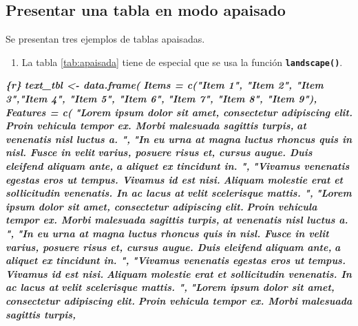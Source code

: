 \documentclass[12pt,a4paper,]{book}
\newenvironment{Shaded}{\begin{snugshade}}{\end{snugshade}}
\newcommand{\InformationTok}[1]{\textcolor[rgb]{0.56,0.35,0.01}{\textbf{\textit{#1}}}}
\providecommand{\tightlist}{%
  \setlength{\itemsep}{0pt}\setlength{\parskip}{0pt}}
\numberwithin{dummy}{section}
\theoremstyle{ocrenumbox}
\theoremstyle{blacknumex}
\theoremstyle{blacknumbox}
\theoremstyle{ocrenum}
\theoremstyle{ocrenum}
\begin{document}
\hypertarget{presentar-una-tabla-en-modo-apaisado}{%
\subsection{Presentar una tabla en modo
apaisado}\label{presentar-una-tabla-en-modo-apaisado}}

Se presentan tres ejemplos de tablas apaisadas.

\begin{enumerate}
\def\labelenumi{\arabic{enumi}.}
\tightlist
\item
  La tabla \ref{tab:apaisada} tiene de especial que se usa la función
  \textbf{\texttt{landscape()}}.
\end{enumerate}

\begin{Shaded}
\begin{Highlighting}[]
\InformationTok{\textasciigrave{}\textasciigrave{}\textasciigrave{}\{r\}}
\InformationTok{text\_tbl \textless{}{-} data.frame(}
\InformationTok{  Items = c("Item 1", "Item 2", "Item 3","Item 4", "Item 5", "Item 6",}
\InformationTok{    "Item 7", "Item 8", "Item 9"), }
\InformationTok{  Features = c(}
\InformationTok{    "Lorem ipsum dolor sit amet, consectetur adipiscing elit.}
\InformationTok{    Proin vehicula tempor ex. Morbi malesuada sagittis turpis,}
\InformationTok{    at venenatis nisl luctus a. ",}
\InformationTok{    "In eu urna at magna luctus rhoncus quis in nisl. Fusce in velit}
\InformationTok{    varius, posuere risus et, cursus augue. Duis eleifend aliquam ante,}
\InformationTok{    a aliquet ex tincidunt in. ",}
\InformationTok{    "Vivamus venenatis egestas eros ut tempus. Vivamus id est nisi.}
\InformationTok{    Aliquam molestie erat et sollicitudin venenatis. In ac lacus at}
\InformationTok{    velit scelerisque mattis. ",}
\InformationTok{    "Lorem ipsum dolor sit amet, consectetur adipiscing elit.}
\InformationTok{    Proin vehicula tempor ex. Morbi malesuada sagittis turpis,}
\InformationTok{    at venenatis nisl luctus a. ",}
\InformationTok{    "In eu urna at magna luctus rhoncus quis in nisl. Fusce in velit}
\InformationTok{    varius, posuere risus et, cursus augue. Duis eleifend aliquam ante,}
\InformationTok{    a aliquet ex tincidunt in. ",}
\InformationTok{    "Vivamus venenatis egestas eros ut tempus. Vivamus id est nisi.}
\InformationTok{    Aliquam molestie erat et sollicitudin venenatis. In ac lacus at}
\InformationTok{    velit scelerisque mattis. ",}
\InformationTok{    "Lorem ipsum dolor sit amet, consectetur adipiscing elit.}
\InformationTok{    Proin vehicula tempor ex. Morbi malesuada sagittis turpis,}

\end{Highlighting}
\end{Shaded}
\end{document}

